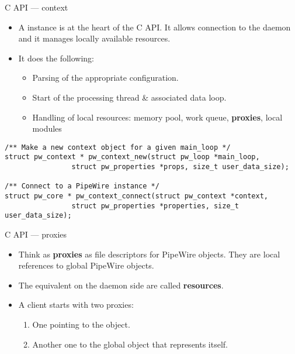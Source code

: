 \begin{frame}[fragile]{C API — context}
  \begin{itemize}

  \item A  instance is at the heart of the C API. It
    allows connection to the daemon and it manages locally available
    resources.

  \item It does the following:

    \begin{itemize}
    \item Parsing of the appropriate configuration.
    \item Start of the processing thread \& associated data loop.
    \item Handling of local resources: memory pool, work queue,
      \textbf{proxies}, local modules
    \end{itemize}

  \end{itemize}

      \begin{block}{}
        \fontsize{9}{9}\selectfont
          \begin{verbatim}
/** Make a new context object for a given main_loop */
struct pw_context * pw_context_new(struct pw_loop *main_loop,
                struct pw_properties *props, size_t user_data_size);

/** Connect to a PipeWire instance */
struct pw_core * pw_context_connect(struct pw_context *context,
                struct pw_properties *properties, size_t user_data_size);
          \end{verbatim}
      \end{block}
\end{frame}



\begin{frame}{C API — proxies}
  \begin{itemize}

  \item Think as \textbf{proxies} as file descriptors for PipeWire
    objects. They are local references to global PipeWire objects.

  \item The equivalent on the daemon side are called \textbf{resources}.

  \item A client starts with two proxies:

    \begin{enumerate}
    \item One pointing to the  object.
    \item Another one to the global  object that represents
      itself.
    \end{enumerate}

  \end{itemize}
\end{frame}



